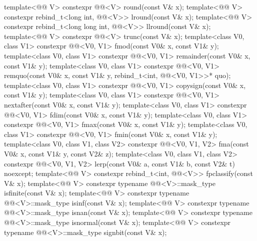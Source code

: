 \begin{codeblock}
{  template<@@ V>
    constexpr @@<V> round(const V& x);
  template<@@ V>
    constexpr rebind_t<long int, @@<V>> lround(const V& x);
  template<@@ V>
    constexpr rebind_t<long long int, @@<V>> llround(const V& x);
  template<@@ V>
    constexpr @@<V> trunc(const V& x);
  template<class V0, class V1>
    constexpr @@<V0, V1> fmod(const V0& x, const V1& y);
  template<class V0, class V1>
    constexpr @@<V0, V1> remainder(const V0& x, const V1& y);
  template<class V0, class V1>
    constexpr @@<V0, V1>
      remquo(const V0& x, const V1& y, rebind_t<int, @@<V0, V1>>* quo);
  template<class V0, class V1>
    constexpr @@<V0, V1> copysign(const V0& x, const V1& y);
  template<class V0, class V1>
    constexpr @@<V0, V1> nextafter(const V0& x, const V1& y);
  template<class V0, class V1>
    constexpr @@<V0, V1> fdim(const V0& x, const V1& y);
  template<class V0, class V1>
    constexpr @@<V0, V1> fmax(const V0& x, const V1& y);
  template<class V0, class V1>
    constexpr @@<V0, V1> fmin(const V0& x, const V1& y);
  template<class V0, class V1, class V2>
    constexpr @@<V0, V1, V2> fma(const V0& x, const V1& y, const V2& z);
  template<class V0, class V1, class V2>
    constexpr @@<V0, V1, V2>
      lerp(const V0& a, const V1& b, const V2& t) noexcept;
  template<@@ V>
    constexpr rebind_t<int, @@<V>> fpclassify(const V& x);
  template<@@ V>
    constexpr typename @@<V>::mask_type isfinite(const V& x);
  template<@@ V>
    constexpr typename @@<V>::mask_type isinf(const V& x);
  template<@@ V>
    constexpr typename @@<V>::mask_type isnan(const V& x);
  template<@@ V>
    constexpr typename @@<V>::mask_type isnormal(const V& x);
  template<@@ V>
    constexpr typename @@<V>::mask_type signbit(const V& x);
}
\end{codeblock}
